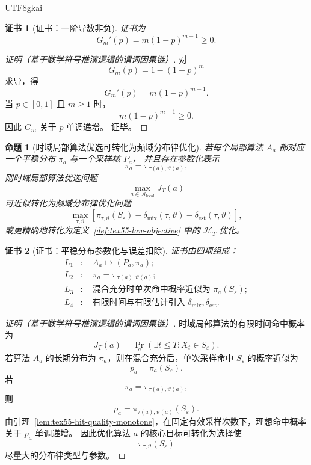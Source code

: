 \documentclass[12pt]{article}
\newtheorem{proposition}{命题}[section]
\newtheorem{Certificate}{证书}[section]
\begin{document}
\begin{CJK*}{UTF8}{gkai}
\begin{Certificate}[证书：一阶导数非负]
\label{cert:tex55-hit-quality-monotone}
证书为
\[
  G_m'(p)=m(1-p)^{m-1}\ge0.
\]
\end{Certificate}

\begin{proof}[证明（基于数学符号推演逻辑的谓词因果链）]
对
\[
  G_m(p)=1-(1-p)^m
\]
求导，得
\[
  G_m'(p)=m(1-p)^{m-1}.
\]
当 \(p\in[0,1]\) 且 \(m\ge1\) 时，
\[
  m(1-p)^{m-1}\ge0.
\]
因此 \(G_m\) 关于 \(p\) 单调递增。
证毕。
\end{proof}

\begin{proposition}[时域局部算法优选可转化为频域分布律优化]
\label{prop:tex55-local-to-law}
若每个局部算法 \(A_a\) 都对应一个平稳分布 \(\pi_a\) 与一个采样核 \(P_a\)，
并且存在参数化表示
\[
  \pi_a=\pi_{\tau(a),\vartheta(a)},
\]
则时域局部算法优选问题
\[
  \max_{a\in\mathcal A_{\mathrm{local}}}J_T(a)
\]
可近似转化为频域分布律优化问题
\[
  \max_{\tau,\vartheta}
  \left[
    \pi_{\tau,\vartheta}(S_\varepsilon)
    -
    \delta_{\mathrm{mix}}(\tau,\vartheta)
    -
    \delta_{\mathrm{est}}(\tau,\vartheta)
  \right],
\]
或更精确地转化为定义~\ref{def:tex55-law-objective} 中的 \(\mathcal H_T\) 优化。
\end{proposition}

\begin{Certificate}[证书：平稳分布参数化与误差扣除]
\label{cert:tex55-local-to-law}
证书由四项组成：
\[
\begin{aligned}
  L_1&:\quad A_a\mapsto(P_a,\pi_a);\\
  L_2&:\quad \pi_a=\pi_{\tau(a),\vartheta(a)};\\
  L_3&:\quad \text{混合充分时单次命中概率近似为 }\pi_a(S_\varepsilon);\\
  L_4&:\quad \text{有限时间与有限估计引入 }\delta_{\mathrm{mix}},\delta_{\mathrm{est}}.
\end{aligned}
\]
\end{Certificate}

\begin{proof}[证明（基于数学符号推演逻辑的谓词因果链）]
时域局部算法的有限时间命中概率为
\[
  J_T(a)=\Pr_a(\exists t\le T:X_t\in S_\varepsilon).
\]
若算法 \(A_a\) 的长期分布为 \(\pi_a\)，则在混合充分后，单次采样命中 \(S_\varepsilon\) 的概率近似为
\[
  p_a=\pi_a(S_\varepsilon).
\]
若
\[
  \pi_a=\pi_{\tau(a),\vartheta(a)},
\]
则
\[
  p_a=\pi_{\tau(a),\vartheta(a)}(S_\varepsilon).
\]
由引理~\ref{lem:tex55-hit-quality-monotone}，在固定有效采样次数下，理想命中概率关于 \(p_a\) 单调递增。
因此优化算法 \(a\) 的核心目标可转化为选择使
\[
  \pi_{\tau,\vartheta}(S_\varepsilon)
\]
尽量大的分布律类型与参数。


\end{proof}
\end{CJK*}
\end{document}
